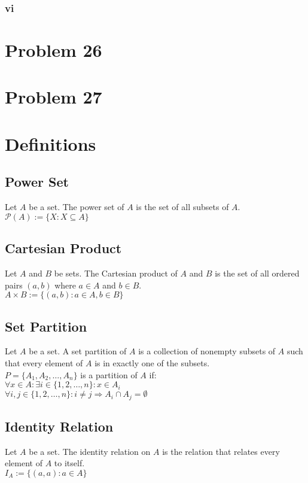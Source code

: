 \documentclass{article}
\begin{document}
\subsubsection*{vi}

\section*{Problem 26}

\section*{Problem 27}

\section*{Definitions}
\subsection*{Power Set}
Let $A$ be a set. The power set of $A$ is the set of all subsets of $A$.\\
$\mathscr{P}(A) := \{X: X \subseteq A\}$\\

\subsection*{Cartesian Product}
Let $A$ and $B$ be sets. The Cartesian product of $A$ and $B$ is the set of all ordered pairs $(a,b)$ where $a \in A$ and $b \in B$.\\
$A \times B := \{(a,b): a\in A, b \in B \}$

\subsection*{Set Partition}
Let $A$ be a set. A set partition of $A$ is a collection of nonempty subsets of $A$ such that every element of $A$ is in exactly one of the subsets.\\
$P = \{A_1, A_2, \ldots, A_n\}$ is a partition of $A$ if:\\
$\forall x \in A: \exists i \in \{1,2,\ldots,n\} : x \in A_i$\\
$\forall i,j \in \{1,2,\ldots,n\} : i \neq j \Rightarrow A_i \cap A_j = \emptyset$\\

\subsection*{Identity Relation}
Let $A$ be a set. The identity relation on $A$ is the relation that relates every element of $A$ to itself.\\
$I_A := \{(a,a): a \in A\}$
\end{document}
